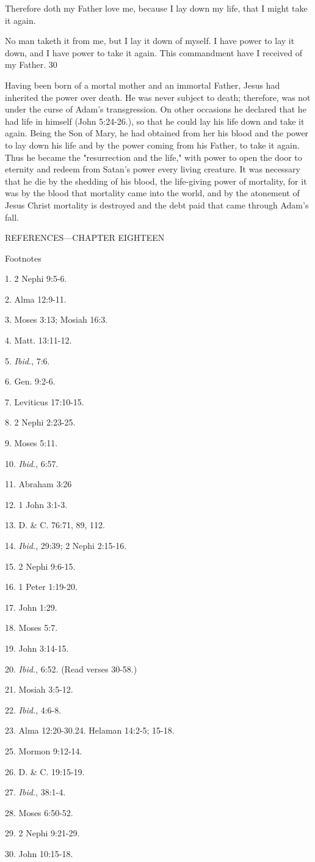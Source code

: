 Therefore doth my Father love me, because I lay down my life, that I might take it again.

No man taketh it from me, but I lay it down of myself. I have power to lay it down, and I
have power to take it again. This commandment have I received of my Father. 30

Having been born of a mortal mother and an immortal Father, Jesus had inherited the power
over death. He was never subject to death; therefore, was not under the curse of Adam's
transgression. On other occasions he declared that he had life in himself (John 5:24-26.), so
that he could lay his life down and take it again. Being the Son of Mary, he had obtained
from her his blood and the power to lay down his life and by the power coming from his
Father, to take it again. Thus he became the "resurrection and the life," with power to open
the door to eternity and redeem from Satan's power every living creature. It was necessary
that he die by the shedding of his blood, the life-giving power of mortality, for it was by the
blood that mortality came into the world, and by the atonement of Jesus Christ mortality is
destroyed and the debt paid that came through Adam's fall.

\newpage
REFERENCES—CHAPTER EIGHTEEN

Footnotes

1. 2 Nephi 9:5-6.

2. Alma 12:9-11.

3. Moses 3:13; Mosiah 16:3.

4. Matt. 13:11-12.

5. \textit{Ibid.}, 7:6.

6. Gen. 9:2-6.

7. Leviticus 17:10-15.

8. 2 Nephi 2:23-25.

9. Moses 5:11.

10. \textit{Ibid.}, 6:57.

11. Abraham 3:26

12. 1 John 3:1-3.

13. D. \& C. 76:71, 89, 112.

14. \textit{Ibid.}, 29:39; 2 Nephi 2:15-16.

15. 2 Nephi 9:6-15.

16. 1 Peter 1:19-20.

17. John 1:29.

18. Moses 5:7.

19. John 3:14-15.

20. \textit{Ibid.}, 6:52. (Read verses 30-58.)

21. Mosiah 3:5-12.

22. \textit{Ibid.}, 4:6-8.

23. Alma 12:20-30.24. Helaman 14:2-5; 15-18.

25. Mormon 9:12-14.

26. D. \& C. 19:15-19.

27. \textit{Ibid.}, 38:1-4.

28. Moses 6:50-52.

29. 2 Nephi 9:21-29.

30. John 10:15-18.


